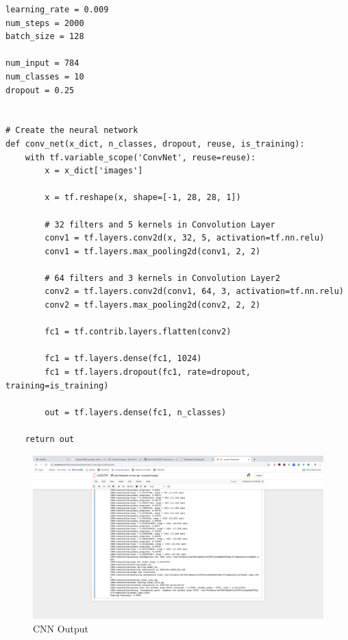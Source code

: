 \documentclass[11pt]{article}
\begin{document}
\begin{lstlisting}
learning_rate = 0.009
num_steps = 2000
batch_size = 128

num_input = 784 
num_classes = 10 
dropout = 0.25


# Create the neural network
def conv_net(x_dict, n_classes, dropout, reuse, is_training):
    with tf.variable_scope('ConvNet', reuse=reuse):
        x = x_dict['images']

        x = tf.reshape(x, shape=[-1, 28, 28, 1])

        # 32 filters and 5 kernels in Convolution Layer
        conv1 = tf.layers.conv2d(x, 32, 5, activation=tf.nn.relu)
        conv1 = tf.layers.max_pooling2d(conv1, 2, 2)

        # 64 filters and 3 kernels in Convolution Layer2
        conv2 = tf.layers.conv2d(conv1, 64, 3, activation=tf.nn.relu)
        conv2 = tf.layers.max_pooling2d(conv2, 2, 2)

        fc1 = tf.contrib.layers.flatten(conv2)

        fc1 = tf.layers.dense(fc1, 1024)
        fc1 = tf.layers.dropout(fc1, rate=dropout, training=is_training)

        out = tf.layers.dense(fc1, n_classes)

    return out
\end{lstlisting}


\begin{figure}[H]
    \centering
    \includegraphics[width=1\textwidth]{Fig7}
    \caption{CNN Output}
\end{figure}
\end{document}

